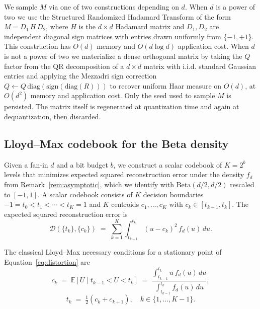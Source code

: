 We sample $M$ via one of two constructions depending on $d$. When $d$ is a
power of two we use the Structured Randomized Hadamard Transform of the
form $M = D_1\, H\, D_2$, where $H$ is the $d \times d$ Hadamard matrix
and $D_1, D_2$ are independent diagonal sign matrices with entries drawn
uniformly from $\{-1, +1\}$. This construction has $O(d)$ memory and
$O(d \log d)$ application cost. When $d$ is not a power of two we
materialize a dense orthogonal matrix by taking the $Q$ factor from the
QR decomposition of a $d \times d$ matrix with i.i.d. standard Gaussian
entries and applying the Mezzadri \citep{mezzadri2007} sign correction
$Q \leftarrow Q\, \mathrm{diag}(\mathrm{sign}(\mathrm{diag}(R)))$ to
recover uniform Haar measure on $O(d)$, at $O(d^2)$ memory and
application cost. Only the seed used to
sample $M$ is persisted. The matrix itself is regenerated at quantization
time and again at dequantization, then discarded.

\subsection{Lloyd--Max codebook for the Beta density}
\label{sec:method-codebook}

Given a fan-in $d$ and a bit budget $b$, we construct a scalar codebook of
$K = 2^b$ levels that minimizes expected squared reconstruction error under
the density $f_d$ from Remark~\ref{rem:asymptotic}, which we identify with
$\mathrm{Beta}(d/2, d/2)$ rescaled to $[-1, 1]$. A scalar codebook consists
of $K$ decision boundaries
$-1 = t_0 < t_1 < \cdots < t_K = 1$ and $K$ centroids $c_1, \ldots, c_K$
with $c_k \in [t_{k-1}, t_k]$. The expected squared reconstruction error
is
\begin{equation}
\mathcal{D}(\{t_k\}, \{c_k\})
  \;=\; \sum_{k=1}^{K} \int_{t_{k-1}}^{t_k}
          (u - c_k)^2\, f_d(u)\, du.
\label{eq:distortion}
\end{equation}

The classical Lloyd--Max necessary conditions
\citep{lloyd1982, max1960} for a stationary point of
Equation~\ref{eq:distortion} are
\begin{equation}
c_k \;=\; \mathbb{E}[U \mid t_{k-1} < U < t_k]
       \;=\; \frac{\int_{t_{k-1}}^{t_k} u\, f_d(u)\, du}
                  {\int_{t_{k-1}}^{t_k} f_d(u)\, du},
\label{eq:centroid-update}
\end{equation}
\begin{equation}
t_k \;=\; \tfrac{1}{2}\left( c_k + c_{k+1} \right),
       \quad k \in \{1, \ldots, K-1\}.
\label{eq:boundary-update}
\end{equation}

